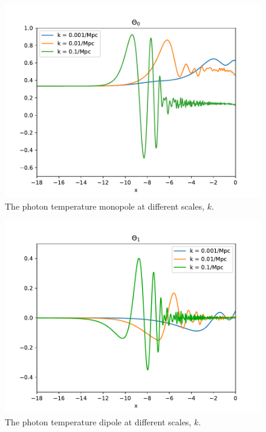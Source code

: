 \documentclass{aa}
\begin{document}
\begin{figure}[h!]
   \includegraphics[scale=0.6]{../figures/milestone3/test_theta_0.pdf}
   \caption{The photon temperature monopole at different scales, $k$.}\label{fig:test3}
\end{figure}

\begin{figure}[h!]
   \includegraphics[scale=0.6]{../figures/milestone3/test_theta_1.pdf}
   \caption{The photon temperature dipole at different scales, $k$.}\label{fig:test4}
\end{figure}
\end{document}
